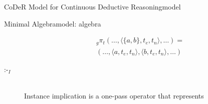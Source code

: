 \begin{nestedsection}{CoDeR Model for Continuous Deductive Reasoning}{model}
\begin{nestedsection}{Minimal Algebra}{model: algebra}
\begin{description}
				\begin{multline*}
					{}_g\pi_t (\dots,\langle \{a,b\},t_e,t_n \rangle,\dots) = \\
						(\dots,\langle a,t_e,t_n \rangle,\langle b,t_e,t_n \rangle,\dots)
				\end{multline*}
			\item[$\text{:-}_I$] \hfill \\
				Instance implication is a one-pass operator that represents 
		\end{description}
	\end{nestedsection}

\end{nestedsection}